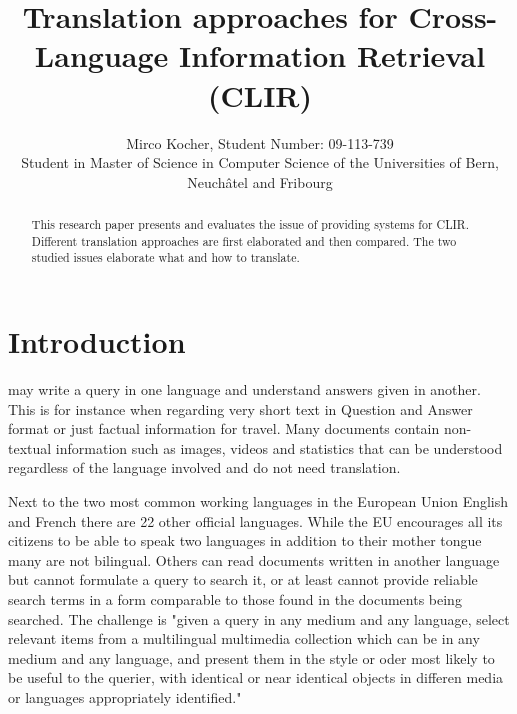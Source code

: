 \documentclass[journal]{IEEEtran}
\begin{document}
\title{ Translation approaches for Cross-Language Information
Retrieval (CLIR)}

\author{Mirco Kocher, Student Number: 09-113-739\\
Student in Master of Science in Computer Science of the Universities of Bern, Neuch\^{a}tel and Fribourg}


\maketitle


\begin{abstract}
This research paper presents and evaluates the issue of providing systems for CLIR.
Different translation approaches are first elaborated and then compared.
The two studied issues elaborate what and how to translate.
\end{abstract}


\section{Introduction}
 may write a query in one language and understand answers given in another.
This is for instance when regarding very short text in Question and Answer format or just factual information for travel.
Many documents contain non-textual information such as images, videos and statistics that can be understood regardless of the language involved and do not need translation.

Next to the two most common working languages in the European Union English and French there are 22 other official languages.
While the EU encourages all its citizens to be able to speak two languages in addition to their mother tongue many  are not bilingual.\cite{ebs386}
Others can read documents written in another language but cannot formulate a query to search it, or at least cannot provide reliable search terms in a form comparable to those found in the documents being searched.
The challenge is "given a query in any medium and any language, select relevant items from a multilingual multimedia collection which can be in any medium and any language, and present them in the style or oder most likely to be useful to the querier, with identical or near identical objects in differen media or languages appropriately identified." \cite{oard97}
\end{document}
